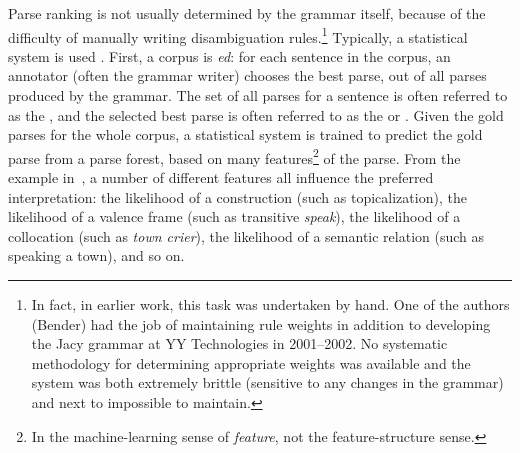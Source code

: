 \documentclass[output=paper
	        ,collection
	        ,collectionchapter
 	        ,biblatex
                ,babelshorthands
                ,newtxmath
                ,draftmode
                ,colorlinks, citecolor=brown
]{langscibook}
\begin{document}
Parse ranking is not usually determined by the grammar itself, because
of the difficulty of manually writing disambiguation
rules.\footnote{In fact, in earlier work, this task was undertaken by
  hand. One of the authors (Bender) had the job of maintaining rule
  weights in addition to developing the Jacy grammar \citep*{SBB2016a}
  at YY Technologies in 2001--2002. No systematic methodology for
  determining appropriate weights was available and the system was
  both extremely brittle (sensitive to any changes in the grammar) and
  next to impossible to maintain.}
Typically, a statistical system is used \citep{Tou:Man:Shi:Fli:Oep:02,Tou:Man:Fli:Oep:05}.
First, a corpus is \textit{ed}:
for each sentence in the corpus,
an annotator (often the grammar writer) chooses the best parse,
out of all parses produced by the grammar.
The set of all parses for a sentence is often referred to as the \textit{},
and the selected best parse is often referred to as the \textit{} or \textit{}.
Given the gold parses for the whole corpus, a statistical system is trained
to predict the gold parse from a parse forest,
based on many features\footnote{%
	In the machine-learning sense of \textit{feature},
	not the feature-structure sense.
}
of the parse.
From the example in~,
a number of different features all influence the preferred interpretation:
the likelihood of a construction (such as topicalization),
the likelihood of a valence frame (such as transitive \textit{speak}),
the likelihood of a collocation (such as \textit{town crier}),
the likelihood of a semantic relation (such as speaking a town),
and so on.
\end{document}
